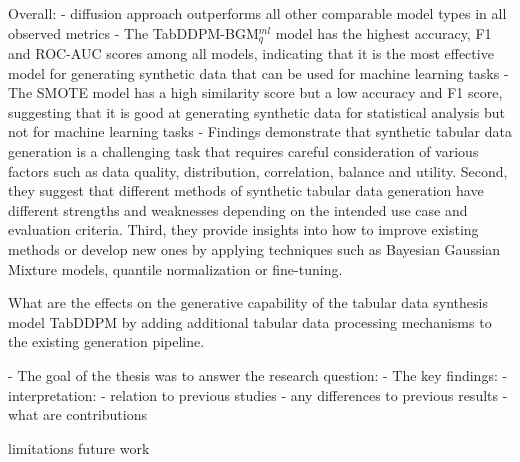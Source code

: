 Overall:
- diffusion approach outperforms all other comparable model types in all observed metrics
- The TabDDPM-BGM$^{ml}_q$ model has the highest accuracy, F1 and ROC-AUC scores among all models, indicating that it is the most effective model for generating synthetic data that can be used for machine learning tasks
- The SMOTE model has a high similarity score but a low accuracy and F1 score, suggesting that it is good at generating synthetic data for statistical analysis but not for machine learning tasks
- Findings demonstrate that synthetic tabular data generation is a challenging task that requires careful consideration of various factors such as data quality, distribution, correlation, balance and utility. 
Second, they suggest that different methods of synthetic tabular data generation have different strengths and weaknesses depending on the intended use case and evaluation criteria. 
Third, they provide insights into how to improve existing methods or develop new ones by applying techniques such as Bayesian Gaussian Mixture models, quantile normalization or fine-tuning.




What are the effects on the generative capability of the tabular data synthesis model 
TabDDPM by adding additional tabular data processing mechanisms to the existing generation pipeline.

- The goal of the thesis was to answer the research question:
- The key findings:
- interpretation:
	- relation to previous studies
	- any differences to previous results
	- what are contributions

limitations
future work



